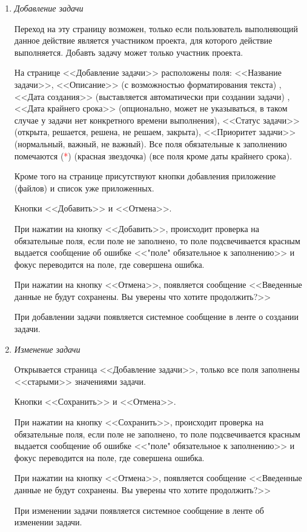 \documentclass[14pt,a4paper]{extarticle}
\begin{document}
\begin{enumerate}
		\item {\it Добавление задачи}
		\par Переход на эту страницу возможен, только если пользователь выполняющий данное действие является участником проекта, для которого действие выполняется. Добавть задачу может только участник проекта.
		\par На странице <<Добавление задачи>> расположены поля: <<Название задачи>>, <<Описание>> (с возможностью форматирования текста) , <<Дата создания>> (выставляется автоматически при создании задачи) , <<Дата крайнего срока>> (опционально, может не указываться, в таком случае у задачи нет конкретного времени выполнения), <<Статус задачи>> (открыта, решается, решена, не решаем, закрыта), <<Приоритет задачи>> (нормальный, важный, не важный). Все поля обязательные к заполнению помечаются (\textcolor{red}{*}) (красная звездочка) (все поля кроме даты крайнего срока).
		\par Кроме того на странице присутствуют кнопки добавления приложение (файлов) и список уже приложенных.
		\par Кнопки <<Добавить>> и <<Отмена>>.
		\par При нажатии на кнопку <<Добавить>>, происходит проверка на обязательные поля, если поле не заполнено, то поле подсвечивается красным выдается сообщение об ошибке <<"поле" обязательное к заполнению>> и фокус переводится на поле, где совершена ошибка.
		\par При нажатии на кнопку <<Отмена>>, появляется сообщение <<Введенные данные не будут сохранены. Вы уверены что хотите продолжить?>>
		\par При добавлении задачи появляется системное сообщение в ленте о создании задачи.

		\item {\it Изменение задачи}
		\par Открывается страница <<Добавление задачи>>, только все поля заполнены <<старыми>> значениями задачи.
		\par Кнопки <<Сохранить>> и <<Отмена>>.
		\par При нажатии на кнопку <<Сохранить>>, происходит проверка на обязательные поля, если поле не заполнено, то поле подсвечивается красным выдается сообщение об ошибке <<"поле" обязательное к заполнению>> и фокус переводится на поле, где совершена ошибка.
		\par При нажатии на кнопку <<Отмена>>, появляется сообщение <<Введенные данные не будут сохранены. Вы уверены что хотите продолжить?>>
		\par При изменении задачи появляется системное сообщение в ленте об изменении задачи.
		

\end{enumerate}
\end{document}
